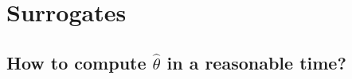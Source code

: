 \documentclass[11pt]{beamer}
\DeclareMathOperator*{\argmin}{arg\,min}
\newcommand{\kk}{\theta}
\newcommand{\uu}{u}
\begin{document}
             
  


\section{Surrogates}
\subsection{\small{How to compute $\hat{\kk}$ in a reasonable time?}}
\end{document}
